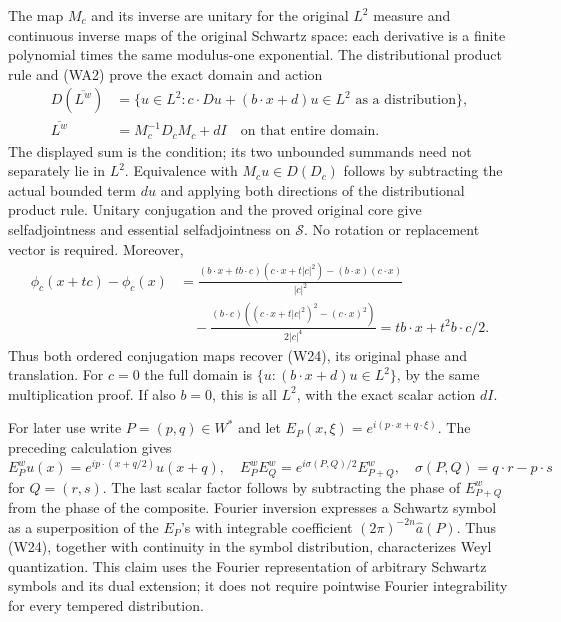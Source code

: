 \documentclass[
  11pt,
]{article}
\begin{document}
The map \(M_c\) and its inverse are unitary for the original \(L^2\)
measure and continuous inverse maps of the original Schwartz space: each
derivative is a finite polynomial times the same modulus-one
exponential. The distributional product rule and (WA2) prove the exact
domain and action \[
 \begin{aligned}
 D(\overline{L^w})&=\{u\in L^2:
            c\cdot Du+(b\cdot x+d)u\in L^2
                          \text{ as a distribution}\},\\
 \overline{L^w}&=M_c^{-1}D_cM_c+dI
       \quad\text{on that entire domain}.
 \end{aligned}
 \tag{WA4}
\] The displayed sum is the condition; its two unbounded summands need
not separately lie in \(L^2\). Equivalence with \(M_cu\in D(D_c)\)
follows by subtracting the actual bounded term \(du\) and applying both
directions of the distributional product rule. Unitary conjugation and
the proved original core give selfadjointness and essential
selfadjointness on \(\mathcal S\). No rotation or replacement vector is
required. Moreover, \[
 \begin{aligned}
 \phi_c(x+tc)-\phi_c(x)
 &=\frac{(b\cdot x+t b\cdot c)(c\cdot x+t|c|^2)
            -(b\cdot x)(c\cdot x)}{|c|^2}\\
 &\quad-\frac{(b\cdot c)((c\cdot x+t|c|^2)^2-(c\cdot x)^2)}{2|c|^4}
 =t b\cdot x+t^2 b\cdot c/2.
 \end{aligned}
 \tag{WA5}
\] Thus both ordered conjugation maps recover (W24), its original phase
and translation. For \(c=0\) the full domain is
\(\{u:(b\cdot x+d)u\in L^2\}\), by the same multiplication proof. If
also \(b=0\), this is all \(L^2\), with the exact scalar action \(dI\).

For later use write \(P=(p,q)\in W^*\) and let
\(E_P(x,\xi)=e^{i(p\cdot x+q\cdot\xi)}\). The preceding calculation
gives \[
E_P^wu(x)=e^{ip\cdot(x+q/2)}u(x+q),\quad
E_P^wE_Q^w=e^{i\sigma(P,Q)/2}E_{P+Q}^w,
\quad \sigma(P,Q)=q\cdot r-p\cdot s
\tag{W25}
\] for \(Q=(r,s)\). The last scalar factor follows by subtracting the
phase of \(E_{P+Q}^w\) from the phase of the composite. Fourier
inversion expresses a Schwartz symbol as a superposition of the
\(E_P\)'s with integrable coefficient \((2\pi)^{-2n}\widehat a(P)\).
Thus (W24), together with continuity in the symbol distribution,
characterizes Weyl quantization. This claim uses the Fourier
representation of arbitrary Schwartz symbols and its dual extension; it
does not require pointwise Fourier integrability for every tempered
distribution.
\end{document}
